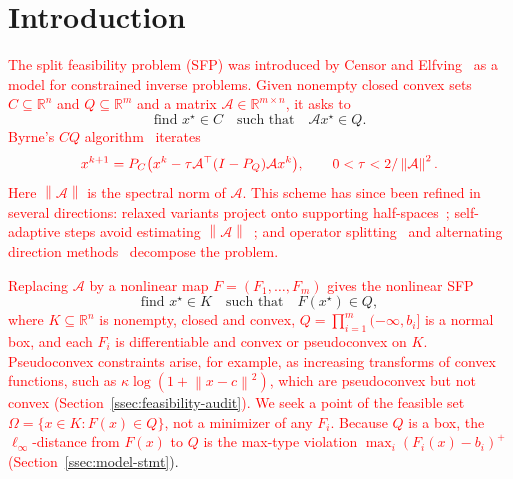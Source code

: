 \documentclass[]{interact}
\theoremstyle{plain}
\theoremstyle{definition}
\theoremstyle{remark}
\newcommand{\R}{\mathbb{R}}
\newcommand{\norm}[1]{\left\lVert #1 \right\rVert}
\begin{document}
\section{Introduction}\label{sec:intro}

\leavevmode\textcolor{red}{The split feasibility problem (SFP) was introduced by Censor and Elfving~\citep{censor1994} as a model for constrained inverse problems. Given nonempty closed convex sets $C\subseteq\R^n$ and $Q\subseteq\R^m$ and a matrix $\mathcal A\in\R^{m\times n}$, it asks to}
\begin{equation}\label{eq:sfp-intro}
\text{find }x^\star\in C\quad\text{such that}\quad\mathcal A x^\star\in Q.
\end{equation}
\leavevmode\textcolor{red}{Byrne's $CQ$ algorithm~\citep{byrne2002} iterates}
\begin{equation}\label{eq:cq-intro}\textcolor{red}{
x^{k+1}=P_C\bigl(x^k-\tau\mathcal A^\top(I-P_Q)\mathcal A x^k\bigr),
\qquad 0<\tau<2/\norm{\mathcal A}^2.
}\end{equation}
\leavevmode\textcolor{red}{Here $\norm{\mathcal A}$ is the spectral norm of $\mathcal A$. This scheme has since been refined in several directions: relaxed variants project onto supporting half-spaces~\citep{yang2004}; self-adaptive steps avoid estimating $\norm{\mathcal A}$~\citep{zhang2009adaptive,zhao2011adaptive,lopez2012}; and operator splitting~\citep{zhang2012simultaneous} and alternating direction methods~\citep{yang2014alternating} decompose the problem.}

\leavevmode\textcolor{red}{Replacing $\mathcal A$ by a nonlinear map $F=(F_1,\dots,F_m)$ gives the nonlinear SFP~\citep{li2013nsfp,yen2019}}
\begin{equation}\label{eq:nsfp-intro}
\text{find }x^\star\in K\quad\text{such that}\quad F(x^\star)\in Q,
\end{equation}
\leavevmode\textcolor{red}{where $K\subseteq\R^n$ is nonempty, closed and convex, $Q=\prod_{i=1}^m(-\infty,b_i]$ is a normal box, and each $F_i$ is differentiable and convex or pseudoconvex on $K$. Pseudoconvex constraints arise, for example, as increasing transforms of convex functions, such as $\kappa\log(1+\norm{x-c}^2)$, which are pseudoconvex but not convex (Section~\ref{ssec:feasibility-audit}). We seek a point of the feasible set $\Omega=\{x\in K:F(x)\in Q\}$, not a minimizer of any $F_i$. Because $Q$ is a box, the $\ell_\infty$-distance from $F(x)$ to $Q$ is the max-type violation $\max_i(F_i(x)-b_i)^+$ (Section~\ref{ssec:model-stmt}}).
\end{document}
